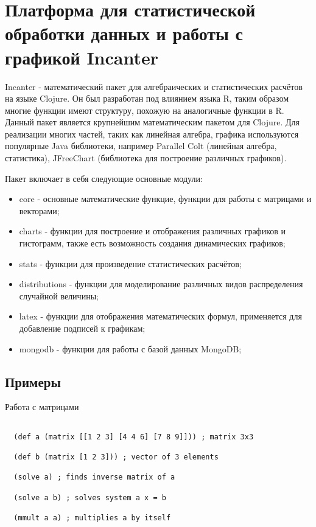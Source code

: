 \section{Платформа для статистической обработки данных и работы с графикой Incanter}

Incanter \cite{incanter}- математический пакет для алгебраических и статистических расчётов на языке Clojure. Он был разработан под влиянием языка R, таким образом многие функции имеют структуру, похожую на аналогичные функции в R. Данный пакет является крупнейшим математическим пакетом для Clojure. Для реализации многих частей, таких как линейная алгебра, графика используются популярные Java библиотеки, например Parallel Colt (линейная алгебра, статистика), JFreeChart (библиотека для построение различных графиков).

Пакет включает в себя следующие основные модули:

\begin{itemize}
\item core - основные математические функцие, функции для работы с матрицами и векторами;

\item charts - функции для построение и отображения различных графиков и гистограмм, также есть возможность создания динамических графиков;

\item stats - функции для произведение статистических расчётов;

\item distributions - функции для моделирование различных видов распределения случайной величины;

\item latex - функции для отображения математических формул, применяется для добавление подписей к графикам;

\item mongodb - функции для работы с базой данных MongoDB;
\end{itemize}

\subsection{Примеры}

Работа с матрицами

\begin{verbatim}

  (def a (matrix [[1 2 3] [4 4 6] [7 8 9]])) ; matrix 3x3

  (def b (matrix [1 2 3])) ; vector of 3 elements

  (solve a) ; finds inverse matrix of a

  (solve a b) ; solves system a x = b

  (mmult a a) ; multiplies a by itself

\end{verbatim}

